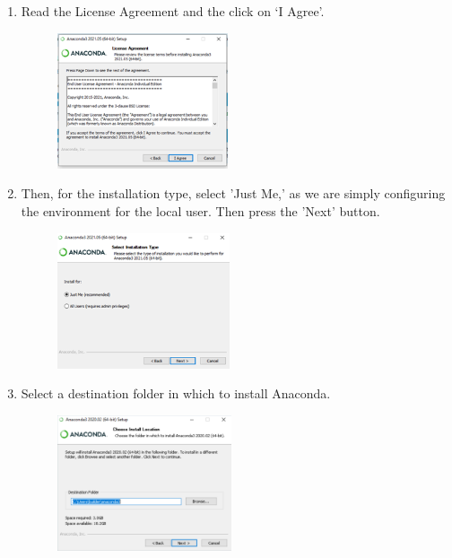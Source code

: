 \documentclass[conference]{IEEEtran}
\begin{document}
\begin{enumerate}
\begin{figure}[!htbp]
    \label{fig:my_label}
\end{figure}
\begin{figure}[!htbp]
    \centering
    
\end{figure}



\item Read the License Agreement and the click on ‘I Agree’.
\begin{figure}[!htbp]
    \centering
    \includegraphics[height=4cm]{Task1 Step5.png}
   
    \label{fig:my_label}
\end{figure}
\begin{figure}[!htbp]
    \centering
    
\end{figure}

\item Then, for the installation type, select 'Just Me,' as we are simply configuring the environment for the local user. Then press the 'Next' button.
\begin{figure}[!htbp]
    \centering
    \includegraphics[height=4cm]{Task1 Step6.png}
   
    \label{fig:my_label}
\end{figure}
\begin{figure}[!htbp]
    \centering
    
\end{figure}

\item
Select a destination folder in which to install Anaconda.
\begin{figure}[!htbp]
    \centering
    \includegraphics[height=4cm]{task7.png}
   

\end{figure}
\end{enumerate}
\end{document}
